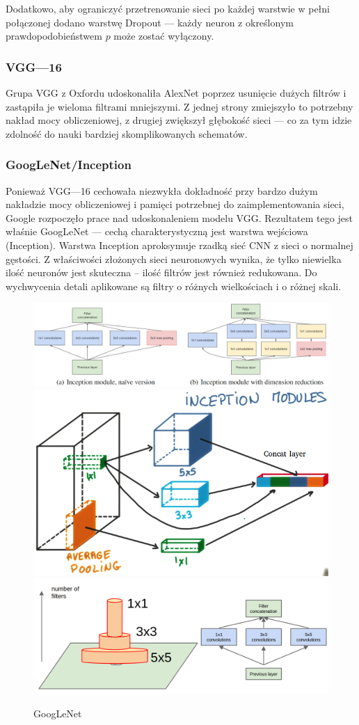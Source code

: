 Dodatkowo, aby ograniczyć przetrenowanie sieci po każdej warstwie w pełni połączonej dodano warstwę Dropout --- każdy neuron z określonym prawdopodobieństwem $p$ może zostać wyłączony. 

\subsubsection{VGG---16}
Grupa VGG z Oxfordu udoskonaliła AlexNet poprzez usunięcie dużych filtrów i zastąpiła je wieloma filtrami mniejszymi. Z jednej strony zmiejszyło to potrzebny nakład mocy obliczeniowej, z drugiej zwiększył głębokość sieci --- co za tym idzie zdolność do nauki bardziej skomplikowanych schematów.

\subsubsection{GoogLeNet/Inception}\cite{43022}
Ponieważ VGG---16 cechowała niezwykła dokładność przy bardzo dużym nakładzie mocy obliczeniowej i pamięci potrzebnej do zaimplementowania sieci, Google rozpoczęło prace nad udoskonaleniem modelu VGG. Rezultatem tego jest właśnie GoogLeNet --- cechą charakterystyczną jest warstwa wejściowa (Inception)\cite{ai_gitbook}. Warstwa Inception aproksymuje rzadką sieć CNN z sieci o normalnej gęstości. Z właściwości złożonych sieci neuronowych wynika, że tylko niewielka ilość neuronów jest skuteczna -- ilość filtrów jest również redukowana. Do wychwycenia detali aplikowane są filtry o różnych wielkościach i o różnej skali. 
\begin{figure}[htp]	
	\centering
	\includegraphics[width=.3\textwidth]{fig/inception_1x1.png}\hfill
	\includegraphics[width=.3\textwidth]{fig/InceptionModules.png}\hfill
	\includegraphics[width=.3\textwidth]{fig/Naive_VersionNception.png}	
	\caption{GoogLeNet}
	\label{fig:GoogLeNet}	
\end{figure}



